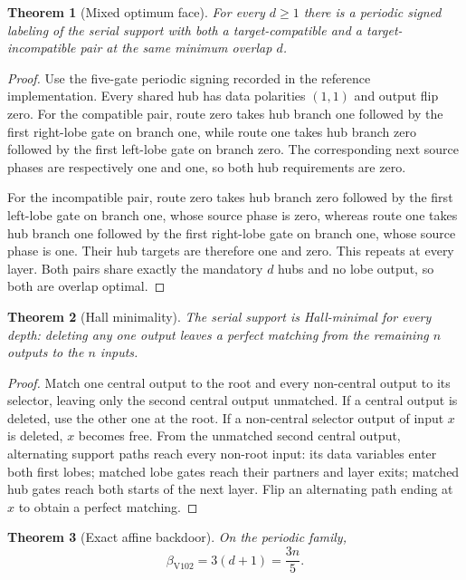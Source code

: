 \documentclass[11pt]{article}
\newtheorem{theorem}{Theorem}
\begin{document}
\begin{theorem}[Mixed optimum face]
For every $d\ge1$ there is a periodic signed labeling of the serial support with both a
target-compatible and a target-incompatible pair at the same minimum overlap $d$.
\end{theorem}

\begin{proof}
Use the five-gate periodic signing recorded in the reference implementation.  Every
shared hub has data polarities $(1,1)$ and output flip zero.  For the compatible pair,
route zero takes hub branch one followed by the first right-lobe gate on branch one,
while route one takes hub branch zero followed by the first left-lobe gate on branch
zero.  The corresponding next source phases are respectively one and one, so both hub
requirements are zero.

For the incompatible pair, route zero takes hub branch zero followed by the first
left-lobe gate on branch one, whose source phase is zero, whereas route one takes hub
branch one followed by the first right-lobe gate on branch one, whose source phase is
one.  Their hub targets are therefore one and zero.  This repeats at every layer.  Both
pairs share exactly the mandatory $d$ hubs and no lobe output, so both are overlap
optimal.
\end{proof}

\begin{theorem}[Hall minimality]
The serial support is Hall-minimal for every depth: deleting any one output leaves a
perfect matching from the remaining $n$ outputs to the $n$ inputs.
\end{theorem}

\begin{proof}
Match one central output to the root and every non-central output to its selector,
leaving only the second central output unmatched.  If a central output is deleted, use
the other one at the root.  If a non-central selector output of input $x$ is deleted,
$x$ becomes free.  From the unmatched second central output, alternating support paths
reach every non-root input: its data variables enter both first lobes; matched lobe
gates reach their partners and layer exits; matched hub gates reach both starts of the
next layer.  Flip an alternating path ending at $x$ to obtain a perfect matching.
\end{proof}

\begin{theorem}[Exact affine backdoor]
On the periodic family,
\[
 \beta_{\mathrm{V102}}=3(d+1)=\frac{3n}{5}.
\]
\end{theorem}
\end{document}
